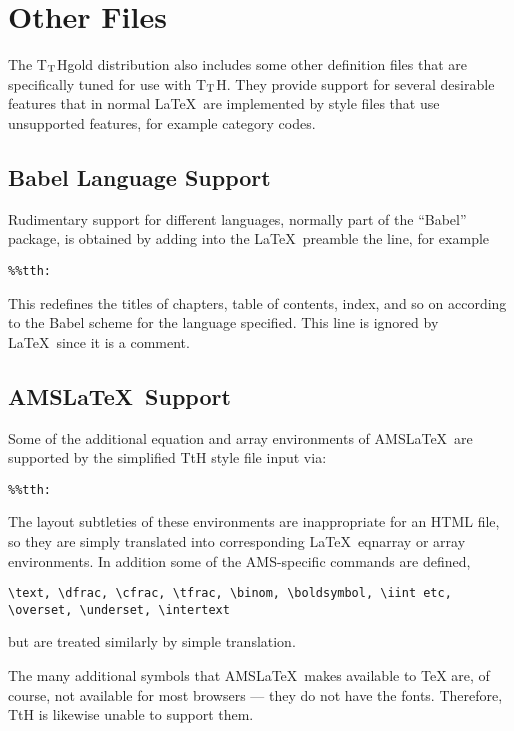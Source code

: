 \documentclass[12pt]{article}
\def\tth{T$_{\rm T}$H}
\begin{document}
\section{Other Files}

The \tth{}gold distribution also includes some other definition files
that are specifically tuned for use with \tth. They provide support
for several desirable features that in normal \LaTeX\ are implemented
by style files that use unsupported features, for example category codes. 

\subsection{Babel Language Support}

Rudimentary support for different languages, normally part of the
``Babel'' package, is obtained by adding into the \LaTeX\ preamble the
line, for example

\begin{verbatim}
%%tth: 
\end{verbatim}

\noindent This redefines the titles of chapters, table of contents, index, and
so on according to the Babel scheme for the language specified. This
line is ignored by \LaTeX\ since it is a comment.

\subsection{AMS\LaTeX\ Support}

Some of the additional equation and array environments of AMS\LaTeX\ are
supported by the simplified TtH style file input via:

\begin{verbatim}
%%tth:
\end{verbatim}

\noindent The layout subtleties of these environments are inappropriate
for an HTML file, so they are simply translated into corresponding
\LaTeX\ eqnarray or array environments. In addition some of the
AMS-specific commands are defined,
\begin{verbatim}
\text, \dfrac, \cfrac, \tfrac, \binom, \boldsymbol, \iint etc,
\overset, \underset, \intertext
\end{verbatim}
 but are treated similarly by simple
translation.

The many additional symbols that AMS\LaTeX\ makes available to TeX
are, of course, not available for most browsers --- they do not
have the fonts. Therefore, TtH is likewise unable to support them.
\end{document}

